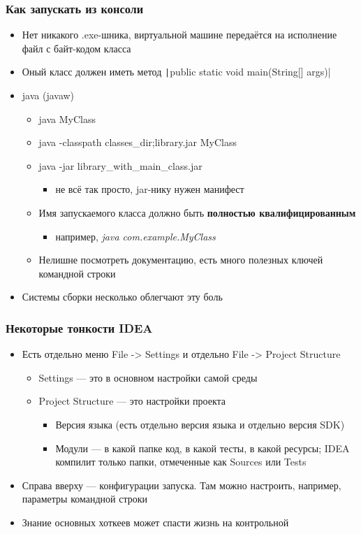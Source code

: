 \documentclass[xetex,mathserif,serif]{beamer}
\begin{document}
	\begin{frame}
		\frametitle{Как запускать из консоли}
		\begin{itemize}
			\item Нет никакого .exe-шника, виртуальной машине передаётся на исполнение файл с байт-кодом класса
			\item Оный класс должен иметь метод \texttt|public static void main(String[] args)|
			\item java (javaw)
			\begin{itemize}
				\item java MyClass
				\item java -classpath classes\_dir;library.jar MyClass
				\item java -jar library\_with\_main\_class.jar
				\begin{itemize}
					\item не всё так просто, jar-нику нужен манифест
				\end{itemize}
				\item Имя запускаемого класса должно быть \textbf{полностью квалифицированным}
				\begin{itemize}
					\item например, \textit{java com.example.MyClass}
				\end{itemize}
				\item Нелишне посмотреть документацию, есть много полезных ключей командной строки
			\end{itemize}
			\item Системы сборки несколько облегчают эту боль
		\end{itemize}
	\end{frame}

	\begin{frame}
		\frametitle{Некоторые тонкости IDEA}
		\begin{itemize}
			\item Есть отдельно меню File -> Settings и отдельно File -> Project Structure
			\begin{itemize}
				\item Settings --- это в основном настройки самой среды
				\item Project Structure --- это настройки проекта
				\begin{itemize}
					\item Версия языка (есть отдельно версия языка и отдельно версия SDK)
					\item Модули --- в какой папке код, в какой тесты, в какой ресурсы; IDEA компилит только папки, отмеченные как Sources или Tests
				\end{itemize}
			\end{itemize}
			\item Справа вверху --- конфигурации запуска. Там можно настроить, например, параметры командной строки
			\item Знание основных хоткеев может спасти жизнь на контрольной
		\end{itemize}
	\end{frame}
\end{document}
